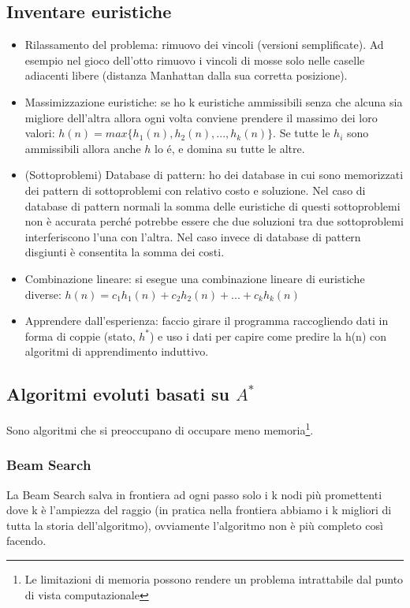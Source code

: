 \documentclass{article}
\begin{document}
\subsection{Inventare euristiche}
\begin{itemize}
    \item Rilassamento del problema: rimuovo dei vincoli (versioni semplificate). Ad esempio nel gioco dell'otto rimuovo i vincoli di mosse solo nelle caselle adiacenti libere (distanza Manhattan dalla sua corretta posizione).
    \item Massimizzazione euristiche: se ho k euristiche ammissibili senza che alcuna sia migliore dell'altra allora ogni volta conviene prendere il massimo dei loro valori: $h(n)=max\{h_1(n),h_2(n), ..., h_k(n)\}$. Se tutte le $h_i$ sono ammissibili allora anche $h$ lo é, e domina su tutte le altre.
    \item (Sottoproblemi) Database di pattern: ho dei database in cui sono memorizzati dei pattern di sottoproblemi con relativo costo e soluzione. Nel caso di database di pattern normali la somma delle euristiche di questi sottoproblemi non è accurata perché potrebbe essere che due soluzioni tra due sottoproblemi interferiscono l'una con l'altra. Nel caso invece di database di pattern disgiunti è consentita la somma dei costi.
    \item Combinazione lineare: si esegue una combinazione lineare di euristiche diverse: $h(n) = c_1h_1(n) + c_2h_2(n) + ... + c_kh_k(n)$
    \item Apprendere dall'esperienza: faccio girare il programma raccogliendo dati in forma di coppie (stato, $h^*$) e uso i dati per capire come predire la h(n) con algoritmi di apprendimento induttivo.
\end{itemize}

\subsection{Algoritmi evoluti basati su $A^*$}
Sono algoritmi che si preoccupano di occupare meno memoria\footnote{Le limitazioni di memoria possono rendere un problema intrattabile dal punto di vista computazionale}.

\subsubsection{Beam Search}
La Beam Search salva in frontiera ad ogni passo solo i k nodi più promettenti dove k è l'ampiezza del raggio (in pratica nella frontiera abbiamo i k migliori di tutta la storia dell'algoritmo), ovviamente l'algoritmo non è più completo così facendo.
\end{document}
